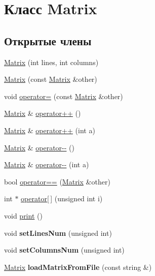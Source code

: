 \hypertarget{class_matrix}{\section{Класс Matrix}
\label{class_matrix}
}
\subsection*{Открытые члены}
\begin{DoxyCompactItemize}
\item 
\hyperlink{class_matrix_ad74c6b0c2db846ab723754759c52dad6}{Matrix} (int lines, int columns)
\item 
\hyperlink{class_matrix_abcf708e864ed3d9db2c3b317c5e529ab}{Matrix} (const \hyperlink{class_matrix}{Matrix} \&other)
\item 
void \hyperlink{class_matrix_a3ce481e0324e859ecca287b76e39473c}{operator=} (const \hyperlink{class_matrix}{Matrix} \&other)
\item 
\hyperlink{class_matrix}{Matrix} \& \hyperlink{class_matrix_a8507366342ab66e74b5a14226bf99791}{operator++} ()
\item 
\hyperlink{class_matrix}{Matrix} \& \hyperlink{class_matrix_a28c611cb965b7486d18a0a2ac4c45d2f}{operator++} (int a)
\item 
\hyperlink{class_matrix}{Matrix} \& \hyperlink{class_matrix_ad408cd4553ebed67bfd3fd5cc17f8423}{operator-\/-\/} ()
\item 
\hyperlink{class_matrix}{Matrix} \& \hyperlink{class_matrix_abecc73da1d79f5fd01cb7334e85b93e7}{operator-\/-\/} (int a)
\item 
bool \hyperlink{class_matrix_a1e08ad098ff5d0a8022d5c735f01c4cb}{operator==} (\hyperlink{class_matrix}{Matrix} \&other)
\item 
int $\ast$ \hyperlink{class_matrix_ae37518aad41f7aa920116dd2ca9a9656}{operator\mbox{[}$\,$\mbox{]}} (unsigned int i)
\item 
void \hyperlink{class_matrix_a99ba97122b8fdd54e95290caf80fc8e2}{print} ()
\item 
\hypertarget{class_matrix_a04d8186abfddfcb928b5f69277a6b66f}{void {\bfseries set\-Lines\-Num} (unsigned int)}\label{class_matrix_a04d8186abfddfcb928b5f69277a6b66f}

\item 
\hypertarget{class_matrix_af79f8f1854e16e5279d04a881c21eddb}{void {\bfseries set\-Columns\-Num} (unsigned int)}\label{class_matrix_af79f8f1854e16e5279d04a881c21eddb}

\item 
\hypertarget{class_matrix_a3097b9717038793d2d73157641e16aef}{\hyperlink{class_matrix}{Matrix} {\bfseries load\-Matrix\-From\-File} (const string \&)}\label{class_matrix_a3097b9717038793d2d73157641e16aef}


\end{DoxyCompactItemize}
